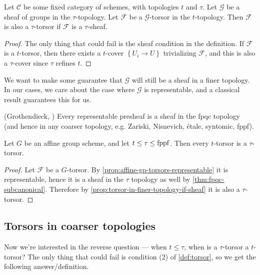 \documentclass[11pt,openany]{book}
\begin{document}
\begin{proposition}\label{prop:torsor-in-finer-topology-if-sheaf} 
Let $\mathscr{C}$ be some fixed category of schemes, with topologies $t$ and $\tau$. Let $\mathcal{G}$ be a sheaf of groups in the $\tau$-topology. Let $\mathcal{F}$ be a $\mathcal{G}$-torsor in the $t$-topology. Then $\mathcal{F}$ is also a $\tau$-torsor if $\mathcal{F}$ is a $\tau$-sheaf.
\end{proposition}
\begin{proof} The only thing that could fail is the sheaf condition in the definition. If $\mathcal{F}$ is a $t$-torsor, then there exists a $t$-cover $\left\{ U_i \to U \right\}$ trivializing $\mathcal{F}$, and this is also a $\tau$-cover since $\tau$ refines $t$. 
\end{proof}

We want to make some guarantee that $\mathcal{G}$ will still be a sheaf in a finer topology. In our cases, we care about the case where $\mathcal{G}$ is representable, and a classical result guarantees this for us.

\begin{theorem}\label{thm:fpqc-subcanonical} 
(Grothendieck, \cite[023Q]{Stacks}) Every representable presheaf is a sheaf in the fpqc topology (and hence in any coarser topology, e.g. Zariski, Nisnevich, \'etale, syntomic, fppf).
\end{theorem}

\begin{corollary} Let $G$ be an affine group scheme, and let $t \le \tau \le \mathrm{fppf}$. Then every $t$-torsor is a $\tau$-torsor.
\end{corollary}
\begin{proof} Let $\mathcal{F}$ be a $G$-torsor. By \autoref{prop:affine-gp-torsors-representable} it is representable, hence it is a sheaf in the $\tau$ topology as well by \autoref{thm:fpqc-subcanonical}. Therefore by \autoref{prop:torsor-in-finer-topology-if-sheaf} it is also a $\tau$-torsor.
\end{proof}

\subsection{Torsors in coarser topologies}

Now we're interested in the reverse question --- when $t\le \tau$, when is a $\tau$-torsor a $t$-torsor? The only thing that could fail is condition (2) of \autoref{def:torsor}, so we get the following answer/definition.
\end{document}
